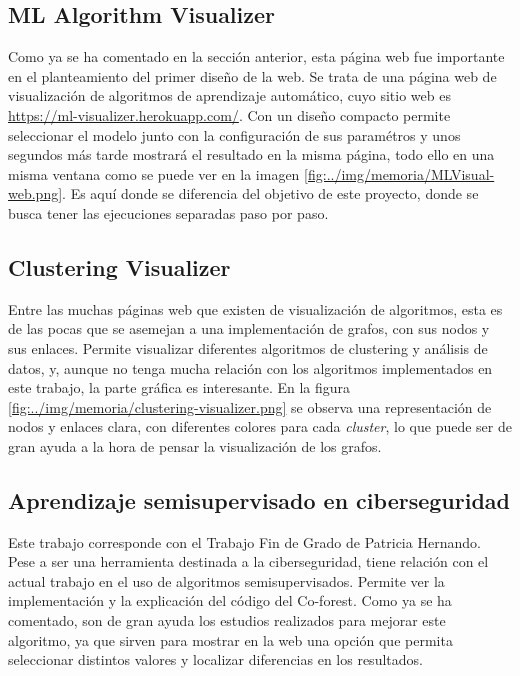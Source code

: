 \subsection{ML Algorithm Visualizer}
Como ya se ha comentado en la sección anterior, esta página web fue importante en el planteamiento del primer diseño de la web. Se trata de una página web de visualización de algoritmos de aprendizaje automático, cuyo sitio web es \url{https://ml-visualizer.herokuapp.com/}. Con un diseño compacto permite seleccionar el modelo junto con la configuración de sus paramétros y unos segundos más tarde mostrará el resultado en la misma página, todo ello en una misma ventana como se puede ver en la imagen \ref{fig:../img/memoria/MLVisual-web.png}. Es aquí donde se diferencia del objetivo de este proyecto, donde se busca tener las ejecuciones separadas paso por paso.


\subsection{Clustering Visualizer}
Entre las muchas páginas web que existen de visualización de algoritmos, esta es de las pocas que se asemejan a una implementación de grafos, con sus nodos y sus enlaces. Permite visualizar diferentes algoritmos de clustering y análisis de datos, y, aunque no tenga mucha relación con los algoritmos implementados en este trabajo, la parte gráfica es interesante. En la figura \ref{fig:../img/memoria/clustering-visualizer.png} se observa una representación de nodos y enlaces clara, con diferentes colores para cada \textit{cluster}, lo que puede ser de gran ayuda a la hora de pensar la visualización de los grafos.
\subsection{Aprendizaje semisupervisado en ciberseguridad}
Este trabajo corresponde con el Trabajo Fin de Grado de Patricia Hernando. Pese a ser una herramienta destinada a la ciberseguridad, tiene relación con el actual trabajo en el uso de algoritmos semisupervisados. Permite ver la implementación y la explicación del código del Co-forest. Como ya se ha comentado, son de gran ayuda los estudios realizados para mejorar este algoritmo, ya que sirven para mostrar en la web una opción que permita seleccionar distintos valores y localizar diferencias en los resultados.